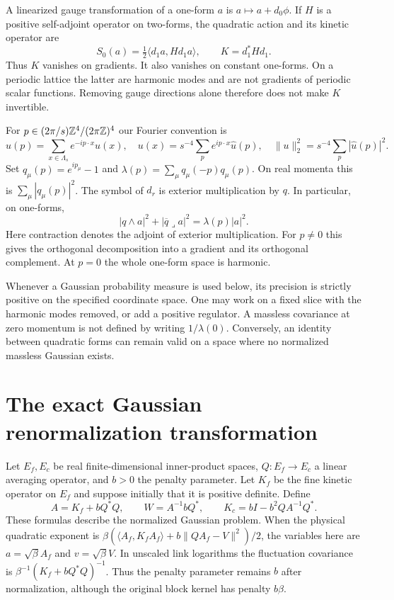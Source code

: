 A linearized gauge transformation of a one-form $a$ is
$a\mapsto a+d_0\phi$. If $H$ is a positive self-adjoint operator on
two-forms, the quadratic action and its kinetic operator are
\begin{equation}
 S_0(a)=\tfrac12\langle d_1a,Hd_1a\rangle,\qquad K=d_1^*Hd_1.
 \label{ch05:kinetic}
\end{equation}
Thus $K$ vanishes on gradients. It also vanishes on constant one-forms.
On a periodic lattice the latter are harmonic modes and are not gradients
of periodic scalar functions. Removing gauge directions alone therefore
does not make $K$ invertible.

For $p\in(2\pi/s)\mathbb Z^4/(2\pi\mathbb Z)^4$ our Fourier convention is
\begin{equation}
 \widehat u(p)=\sum_{x\in\Lambda_s}e^{-ip\cdot x}u(x),
 \quad
 u(x)=s^{-4}\sum_p e^{ip\cdot x}\widehat u(p),
 \quad
 \|u\|_2^2=s^{-4}\sum_p|\widehat u(p)|^2.
 \label{ch05:fourier}
\end{equation}
Set $q_\mu(p)=e^{ip_\mu}-1$ and
$\lambda(p)=\sum_\mu q_\mu(-p)q_\mu(p)$.
On real momenta this is $\sum_\mu|q_\mu(p)|^2$.
The symbol of $d_r$ is exterior multiplication by $q$.
In particular, on one-forms,
\[
 |q\wedge a|^2+|\overline q\mathbin{\lrcorner}a|^2
      =\lambda(p)|a|^2.
\]
Here contraction denotes the adjoint of exterior multiplication.
For $p\ne0$ this gives the orthogonal decomposition into a gradient
and its orthogonal complement. At $p=0$ the whole one-form space is
harmonic.

Whenever a Gaussian probability measure is used below, its precision is
strictly positive on the specified coordinate space. One may work on a
fixed slice with the harmonic modes removed, or add a positive regulator.
A massless covariance at zero momentum is not defined by writing
$1/\lambda(0)$. Conversely, an identity between quadratic forms can
remain valid on a space where no normalized massless Gaussian exists.

\section{The exact Gaussian renormalization transformation}
\label{ch05:schur}

Let $E_f,E_c$ be real finite-dimensional inner-product spaces, $Q:E_f\to
E_c$ a linear averaging operator, and $b>0$ the penalty parameter. Let $K_f$ be the fine kinetic operator on $E_f$ and suppose initially
that it is positive definite. Define
\begin{equation}
 A=K_f+bQ^*Q,\qquad
 W=A^{-1}bQ^*,\qquad
 K_c=bI-b^2QA^{-1}Q^* .
 \label{ch05:schur-data}
\end{equation}
These formulas describe the normalized Gaussian problem. When the
physical quadratic exponent is
$\beta(\langle A_f,K_fA_f\rangle+b\|QA_f-V\|^2)/2$,
the variables here are $a=\sqrt{\beta}A_f$ and
$v=\sqrt{\beta}V$. In unscaled link logarithms the fluctuation
covariance is $\beta^{-1}(K_f+bQ^*Q)^{-1}$.
Thus the penalty parameter remains $b$ after normalization, although
the original block kernel has penalty $b\beta$.

